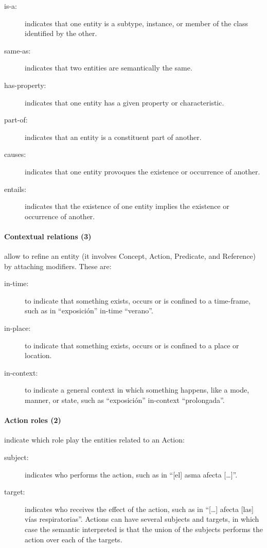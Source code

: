 \documentclass[a4paper,11pt,twocolumn,twoside]{article}
\begin{document}
\begin{description}
  \item[is-a:] indicates that one entity is a subtype, instance, or member of the class identified by the other.
  \item[same-as:] indicates that two entities are semantically the same.
  \item[has-property:] indicates that one entity has a given property or characteristic.
  \item[part-of:] indicates that an entity is a constituent part of another.
  \item[causes:] indicates that one entity provoques the existence or occurrence of another.
  \item[entails:] indicates that the existence of one entity implies the existence or occurrence of another.
\end{description}

\paragraph{Contextual relations (3)} allow to refine an entity (it involves Concept, Action, Predicate, and Reference) by attaching modifiers. These are:

\begin{description}
  \item[in-time:] to indicate that something exists, occurs or is confined to a time-frame, such as in “exposición” in-time “verano”.
  \item[in-place:] to indicate that something exists, occurs or is confined to a place or location.
  \item[in-context:] to indicate a general context in which something happens, like a mode, manner, or state, such as “exposición” in-context “prolongada”.
\end{description}

\paragraph{Action roles (2)} indicate which role play the entities related to an Action:

\begin{description}
  \item[subject:] indicates who performs the action, such as in “[el] asma afecta […]”.
  \item[target:] indicates who receives the effect of the action, such as in “[…] afecta [las] vías respiratorias”. Actions can have several subjects and targets, in which case the semantic interpreted is that the union of the subjects performs the action over each of the targets.
\end{description}
\end{document}
